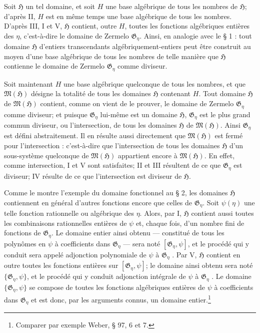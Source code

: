 Soit $\mathfrak H$ un tel domaine, et soit $H$ une base algébrique de tous les nombres de $\mathfrak H$; d'après II, $H$ est en même temps une base algébrique de tous les nombres. D'après III, I et V, $\mathfrak H$ contient, outre $H$, toutes les fonctions algébriques entières des $\eta$, c'est-à-dire le domaine de Zermelo $\mathfrak G_\eta$. Ainsi, en analogie avec le \S{} 1 : tout domaine $\mathfrak H$ d'entiers transcendants algébriquement-entiers peut être construit au moyen d'une base algébrique de tous les nombres de telle manière que $\mathfrak H$ contienne le domaine de Zermelo $\mathfrak G_\eta$ comme diviseur.

Soit maintenant $H$ une base algébrique quelconque de tous les nombres, et que $\mathfrak M(\mathfrak H)$ désigne la totalité de tous les domaines $\mathfrak H$ contenant $H$. Tout domaine $\mathfrak H$ de $\mathfrak M(\mathfrak H)$ contient, comme on vient de le prouver, le domaine de Zermelo $\mathfrak G_\eta$ comme diviseur; et puisque $\mathfrak G_\eta$ lui-même est un domaine $\mathfrak H$, $\mathfrak G_\eta$ est le plus grand commun diviseur, ou l'intersection, de tous les domaines $\mathfrak H$ de $\mathfrak M(\mathfrak H)$. Ainsi $\mathfrak G_\eta$ est défini abstraitement. Il en résulte aussi directement que $\mathfrak M(\mathfrak H)$ est fermé pour l'intersection : c'est-à-dire que l'intersection de tous les domaines $\mathfrak H$ d'un sous-système quelconque de $\mathfrak M(\mathfrak H)$ appartient encore à $\mathfrak M(\mathfrak H)$. En effet, comme intersection, I et V sont satisfaites; II et III résultent de ce que $\mathfrak G_\eta$ est diviseur; IV résulte de ce que l'intersection est diviseur de $\mathfrak H$.

Comme le montre l'exemple du domaine fonctionnel au \S{} 2, les domaines $\mathfrak H$ contiennent en général d'autres fonctions encore que celles de $\mathfrak G_\eta$. Soit $\psi(\eta)$ une telle fonction rationnelle ou algébrique des $\eta$. Alors, par I, $\mathfrak H$ contient aussi toutes les combinaisons rationnelles entières de $\psi$ et, chaque fois, d'un nombre fini de fonctions de $\mathfrak G_\eta$. Le domaine entier ainsi obtenu --- constitué de tous les polynômes en $\psi$ à coefficients dans $\mathfrak G_\eta$ --- sera noté $[\mathfrak G_\eta,\psi]$, et le procédé qui y conduit sera appelé \og{} adjonction polynomiale de $\psi$ à $\mathfrak G_\eta$ \fg{}. Par V, $\mathfrak H$ contient en outre toutes les fonctions entières sur $[\mathfrak G_\eta,\psi]$; le domaine ainsi obtenu sera noté $\{\mathfrak G_\eta,\psi\}$, et le procédé qui y conduit \og{} adjonction intégrale de $\psi$ à $\mathfrak G_\eta$ \fg{}. Le domaine $\{\mathfrak G_\eta,\psi\}$ se compose de toutes les fonctions algébriques entières de $\psi$ à coefficients dans $\mathfrak G_\eta$ et est donc, par les arguments connus, un domaine entier.\footnote{Comparer par exemple Weber, \S{} 97, 6 et 7.}

